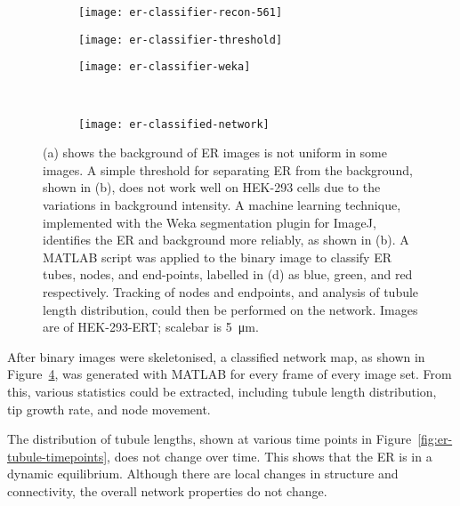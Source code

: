 \begin{figure}[htbp!]
	\centering
	\begin{subfigure}[b]{0.325\textwidth}
		\texttt{[image: er-classifier-recon-561]}
		\caption{} \label{fig:er-classifier-recon-561}
	\end{subfigure}	
	\hfill
	\begin{subfigure}[b]{0.325\textwidth}
		\texttt{[image: er-classifier-threshold]}
		\caption{} \label{fig:ER-classifier-threshold}
	\end{subfigure}	
	\hfill
	\begin{subfigure}[b]{0.325\textwidth}
		\texttt{[image: er-classifier-weka]}
		\caption{} \label{fig:ER-classifier-weka}
	\end{subfigure}	

	~\newline
	\begin{subfigure}[b]{0.8\textwidth}
		\texttt{[image: er-classified-network]}
		\caption{} \label{fig:er-classified-network}
	\end{subfigure}
	\caption[ER: Weka segmentation allows the ER network to be extracted from a non-uniform background]{(a) shows the background of ER images is not uniform in some images. A simple threshold for separating ER from the background, shown in (b), does not work well on HEK-293 cells due to the variations in background intensity. A machine learning technique, implemented with the Weka segmentation plugin for ImageJ, identifies the ER and background more reliably, as shown in (b). A MATLAB script was applied to the binary image to classify ER tubes, nodes, and end-points, labelled in (d) as blue, green, and red respectively. Tracking of nodes and endpoints, and analysis of tubule length distribution, could then be performed on the network. Images are of HEK-293-ERT; scalebar is \SI{5}{\micro\metre}. } 
	\label{fig:ER-classifier}
\end{figure}

After binary images were skeletonised, a classified network map, as shown in Figure~\ref{fig:er-classified-network}, was generated with MATLAB for every frame of every image set. 
From this, various statistics could be extracted, including tubule length distribution, tip growth rate, and node movement. 

The distribution of tubule lengths, shown at various time points in Figure~\ref{fig:er-tubule-timepoints}, does not change over time. 
This shows that the ER is in a dynamic equilibrium. 
Although there are local changes in structure and connectivity, the overall network properties do not change. 

